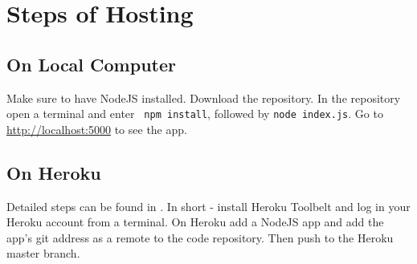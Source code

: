 \documentclass[10pt]{article}
\begin{document}
\section{Steps of Hosting}

\subsection{On Local Computer}
Make sure to have NodeJS installed. Download the repository. In the repository open a terminal and enter \texttt{
npm install}, followed by \texttt{node index.js}. Go to \url{http://localhost:5000} to see the app.

\subsection{On Heroku}
Detailed steps can be found in \cite{heroku}. In short - install Heroku Toolbelt and log in your Heroku account from a terminal. On Heroku add a NodeJS app and add the app's git address as a remote to the code repository. Then push to the Heroku master branch.

\medskip


\end{document}
